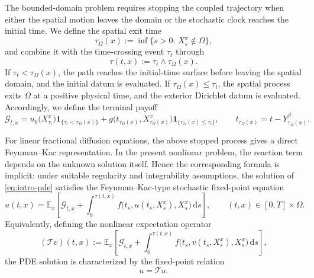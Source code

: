 \documentclass[a4paper,fleqn]{cas-sc}
\newcommand{\rd}{\mathrm{d}}
\begin{document}
The bounded-domain problem requires stopping the coupled trajectory when either
the spatial motion leaves the domain or the stochastic clock reaches the initial
time. We define the spatial exit time
\begin{equation}\label{eq:exit-space}
\tau_\Omega(x)
:=
\inf\{s>0:\,X_s^x\notin\Omega\},
\end{equation}
and combine it with the time-crossing event \(\tau_t\) through
\begin{equation}\label{eq:tau-nonlinear}
\tau(t,x):=\tau_t\wedge\tau_\Omega(x).
\end{equation}
If $\tau_t<\tau_\Omega(x)$, the path reaches the initial-time surface before leaving
the spatial domain, and the initial datum is evaluated. If
$\tau_\Omega(x)\le\tau_t$, the spatial process exits $\Omega$ at a positive physical
time, and the exterior Dirichlet datum is evaluated. Accordingly, we define the
terminal payoff
\begin{equation}\label{eq:terminal-payoff-prelim}
\mathcal{G}_{t,x}
=
u_0\!\bigl(X_{\tau_t}^x\bigr)\mathbf{1}_{\{\tau_t<\tau_\Omega(x)\}}
+
g\!\bigl(t_{\tau_\Omega(x)},X_{\tau_\Omega(x)}^x\bigr)
\mathbf{1}_{\{\tau_\Omega(x)\le\tau_t\}},
\qquad
t_{\tau_\Omega(x)}=t-Y_{\tau_\Omega(x)}^\beta .
\end{equation}

For linear fractional diffusion equations, the above stopped process gives a direct
Feynman--Kac representation. In the present nonlinear problem, the reaction term
depends on the unknown solution itself. Hence the corresponding formula is implicit:
under suitable regularity and integrability assumptions, the solution of
\eqref{eq:intro-pde} satisfies the Feynman--Kac-type stochastic fixed-point equation
\begin{equation}\label{eq:nonlinear-fk}
u(t,x)
=
\mathbb{E}_x\!\left[
\mathcal{G}_{t,x}
+
\int_0^{\tau(t,x)}
f\!\bigl(t_s,u(t_s,X_s^x),X_s^x\bigr)\,\rd s
\right],
\qquad (t,x)\in[0,T]\times\Omega .
\end{equation}
Equivalently, defining the nonlinear expectation operator
\begin{equation}\label{eq:T-operator-prelim}
(\mathcal{T}v)(t,x)
:=
\mathbb{E}_x\!\left[
\mathcal{G}_{t,x}
+
\int_0^{\tau(t,x)}
f\!\bigl(t_s,v(t_s,X_s^x),X_s^x\bigr)\,\rd s
\right],
\end{equation}
the PDE solution is characterized by the fixed-point relation
\begin{equation}\label{eq:fixed-point-prelim}
u=\mathcal{T}u .
\end{equation}
\end{document}
